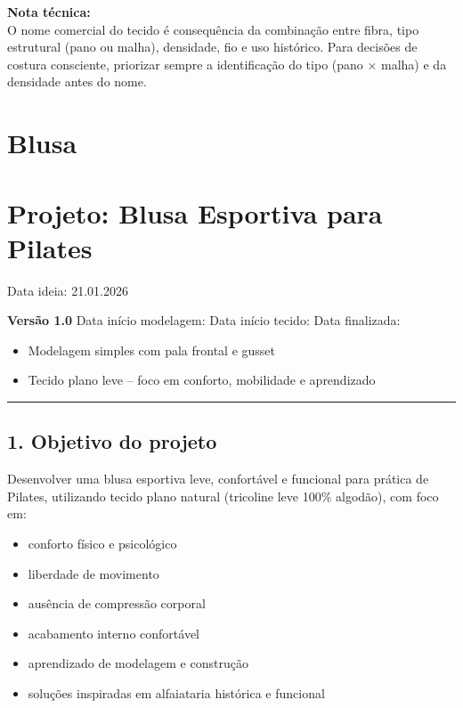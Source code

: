 \documentclass[
  10pt,oneside]{article}
\providecommand{\tightlist}{%
  \setlength{\itemsep}{0pt}\setlength{\parskip}{0pt}}
\begin{document}
\textbf{Nota técnica:}\\
O nome comercial do tecido é consequência da combinação entre fibra, tipo estrutural (pano ou malha), densidade, fio e uso histórico. Para decisões de costura consciente, priorizar sempre a identificação do tipo (pano × malha) e da densidade antes do nome.

\newpage

\section{Blusa}\label{blusa}

\section{Projeto: Blusa Esportiva para Pilates}\label{projeto-blusa-esportiva-para-pilates}

Data ideia: 21.01.2026

\textbf{Versão 1.0}
Data início modelagem:
Data início tecido:
Data finalizada:

\begin{itemize}
\tightlist
\item
  Modelagem simples com pala frontal e gusset
\item
  Tecido plano leve -- foco em conforto, mobilidade e aprendizado
\end{itemize}

\begin{center}\rule{0.5\linewidth}{0.5pt}\end{center}

\subsection{1. Objetivo do projeto}\label{objetivo-do-projeto}

Desenvolver uma blusa esportiva leve, confortável e funcional para prática de Pilates, utilizando tecido plano natural (tricoline leve 100\% algodão), com foco em:

\begin{itemize}
\tightlist
\item
  conforto físico e psicológico
\item
  liberdade de movimento
\item
  ausência de compressão corporal
\item
  acabamento interno confortável
\item
  aprendizado de modelagem e construção
\item
  soluções inspiradas em alfaiataria histórica e funcional
\end{itemize}
\end{document}
